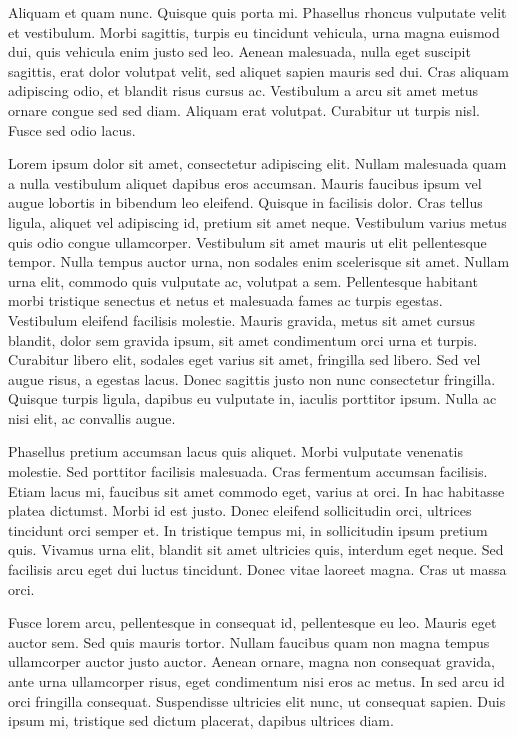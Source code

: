 \documentclass[draft=false]{book}
\begin{document}
Aliquam et quam nunc. Quisque quis porta mi. Phasellus rhoncus vulputate velit et vestibulum. Morbi sagittis, turpis eu tincidunt vehicula, urna magna euismod dui, quis vehicula enim justo sed leo. Aenean malesuada, nulla eget suscipit sagittis, erat dolor volutpat velit, sed aliquet sapien mauris sed dui. Cras aliquam adipiscing odio, et blandit risus cursus ac. Vestibulum a arcu sit amet metus ornare congue sed sed diam. Aliquam erat volutpat. Curabitur ut turpis nisl. Fusce sed odio lacus. 

Lorem ipsum dolor sit amet, consectetur adipiscing elit. Nullam malesuada quam a nulla vestibulum aliquet dapibus eros accumsan. Mauris faucibus ipsum vel augue lobortis in bibendum leo eleifend. Quisque in facilisis dolor. Cras tellus ligula, aliquet vel adipiscing id, pretium sit amet neque. Vestibulum varius metus quis odio congue ullamcorper. Vestibulum sit amet mauris ut elit pellentesque tempor. Nulla tempus auctor urna, non sodales enim scelerisque sit amet. Nullam urna elit, commodo quis vulputate ac, volutpat a sem. Pellentesque habitant morbi tristique senectus et netus et malesuada fames ac turpis egestas. Vestibulum eleifend facilisis molestie. Mauris gravida, metus sit amet cursus blandit, dolor sem gravida ipsum, sit amet condimentum orci urna et turpis. Curabitur libero elit, sodales eget varius sit amet, fringilla sed libero. Sed vel augue risus, a egestas lacus. Donec sagittis justo non nunc consectetur fringilla. Quisque turpis ligula, dapibus eu vulputate in, iaculis porttitor ipsum. Nulla ac nisi elit, ac convallis augue.

Phasellus pretium accumsan lacus quis aliquet. Morbi vulputate venenatis molestie. Sed porttitor facilisis malesuada. Cras fermentum accumsan facilisis. Etiam lacus mi, faucibus sit amet commodo eget, varius at orci. In hac habitasse platea dictumst. Morbi id est justo. Donec eleifend sollicitudin orci, ultrices tincidunt orci semper et. In tristique tempus mi, in sollicitudin ipsum pretium quis. Vivamus urna elit, blandit sit amet ultricies quis, interdum eget neque. Sed facilisis arcu eget dui luctus tincidunt. Donec vitae laoreet magna. Cras ut massa orci.

Fusce lorem arcu, pellentesque in consequat id, pellentesque eu leo. Mauris eget auctor sem. Sed quis mauris tortor. Nullam faucibus quam non magna tempus ullamcorper auctor justo auctor. Aenean ornare, magna non consequat gravida, ante urna ullamcorper risus, eget condimentum nisi eros ac metus. In sed arcu id orci fringilla consequat. Suspendisse ultricies elit nunc, ut consequat sapien. Duis ipsum mi, tristique sed dictum placerat, dapibus ultrices diam.
\end{document}
